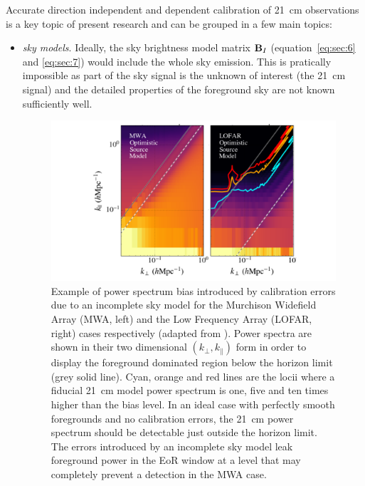 Accurate direction independent and dependent calibration of 21~cm observations is a key topic of present research and can be grouped in a few main topics: 
%
\begin{itemize}
\item {\it sky models}. Ideally, the sky brightness model matrix ${\bf B}_I$ (equation~\ref{eq:sec:6} and \ref{eq:sec:7}) would include the whole sky emission. This is pratically impossible as part of the sky signal is the unknown of interest (the 21~cm signal) and the detailed properties of the foreground sky are not known sufficiently well. \begin{figure}[]
\begin{center}
\includegraphics[width=1.\textwidth]{Bernardi/calibration_errors}
\end{center}
\caption{Example of power spectrum bias introduced by calibration errors due to an incomplete sky model for the Murchison Widefield Array (MWA, left) and the Low Frequency Array (LOFAR, right) cases respectively (adapted from \cite{ewall-wice17}). Power spectra are shown in their two dimensional $(k_\perp,k_\parallel)$ form in order to display the foreground dominated region below the horizon limit (grey solid line). Cyan, orange and red lines are the locii where a fiducial 21~cm model power spectrum is one, five and ten times higher than the bias level. In an ideal case with perfectly smooth foregrounds and no calibration errors, the 21~cm power spectrum should be detectable just outside the horizon limit. The errors introduced by an incomplete sky model leak foreground power in the EoR window at a level that may completely prevent a detection in the MWA case.}
\label{fig:fig_added}
\end{figure}

\end{itemize}
